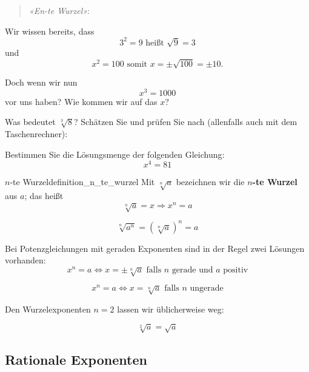 \begin{verse}
\textit{«En-te Wurzel»}:
\end{verse}

Wir wissen bereits, dass
$$3^2 = 9 \textrm{ heißt } \sqrt{9} = 3$$
und
$$x^2 = 100 \textrm{ somit } x=\pm\sqrt{100} = \pm 10.$$

Doch wenn wir nun
$$x^3 = 1000$$
vor uns haben? Wie kommen wir auf das $x$?



Was bedeutet $\sqrt[3]{8}$? Schätzen Sie und prüfen Sie nach (allenfalls auch mit dem Taschenrechner):


Bestimmen Sie die Lösungsmenge der folgenden Gleichung:
$$x^4 = 81$$


\newpage
\begin{definition}{$n$-te Wurzel}{definition_n_te_wurzel}
Mit $\sqrt[n]{a}$ bezeichnen wir die $n$\textbf{-te Wurzel} aus $a$; das heißt
$$\sqrt[n]{a} = x \Rightarrow x^n = a$$
\end{definition}

\begin{gesetz}{}{}
$$\sqrt[n]{a^n} = \left(\sqrt[n]a\right)^n = a$$
\end{gesetz}


\begin{bemerkung}{}{}
Bei Potenzgleichungen mit geraden Exponenten sind in der Regel zwei Lösungen vorhanden:
$$x^n = a \Leftrightarrow x = \pm \sqrt[n]{a} \textrm{ falls } n \textrm{ gerade und } a \textrm{ positiv}$$

$$x^n = a \Leftrightarrow x = \sqrt[n]{a} \textrm{ falls } n \textrm{ ungerade}$$
\end{bemerkung}

\begin{bemerkung}{}{}
Den Wurzelexponenten $n=2$ lassen wir üblicherweise weg:

$$\sqrt[2]{a} = \sqrt{a}$$
\end{bemerkung}
\newpage


\subsection{Rationale Exponenten}

